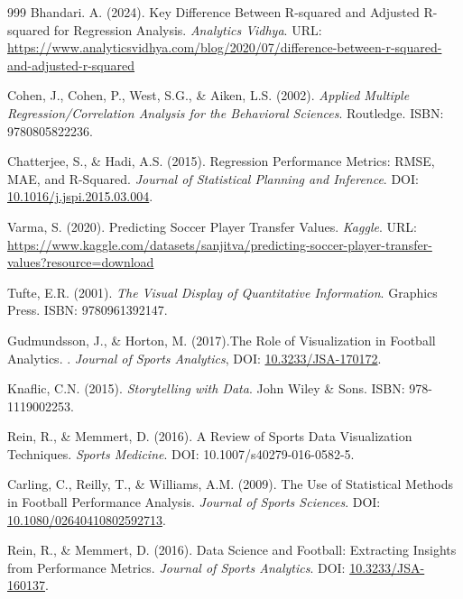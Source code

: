 \documentclass[12pt, a4paper,oneside]{book}
\numberwithin{equation}{section}
\begin{document}
\begin{thebibliography}{999}
Bhandari. A. (2024). Key Difference Between R-squared and Adjusted R-squared for Regression Analysis. \textit{Analytics Vidhya}. URL: \href{https://www.analyticsvidhya.com/blog/2020/07/difference-between-r-squared-and-adjusted-r-squared}{https://www.analyticsvidhya.com/blog/2020/07/difference-between-r-squared-and-adjusted-r-squared}

Cohen, J., Cohen, P., West, S.G., \& Aiken, L.S. (2002). \textit{Applied Multiple Regression/Correlation Analysis for the Behavioral Sciences}. Routledge. ISBN: 9780805822236.

Chatterjee, S., \& Hadi, A.S. (2015). Regression Performance Metrics: RMSE, MAE, and R-Squared. \textit{Journal of Statistical Planning and Inference}. DOI: \href{https://doi.org/10.1016/j.jspi.2015.03.004}{10.1016/j.jspi.2015.03.004}.

Varma, S. (2020). Predicting Soccer Player Transfer Values. \textit{Kaggle}. URL: \href{https://www.kaggle.com/datasets/sanjitva/predicting-soccer-player-transfer-values?resource=download}{https://www.kaggle.com/datasets/sanjitva/predicting-soccer-player-transfer-values?resource=download}

Tufte, E.R. (2001). \textit{The Visual Display of Quantitative Information}. Graphics Press. ISBN: 9780961392147.

Gudmundsson, J., \& Horton, M. (2017).The Role of Visualization in Football Analytics. . \textit{Journal of Sports Analytics}, DOI: \href{https://doi.org/10.3233/JSA-170172}{10.3233/JSA-170172}.

Knaflic, C.N. (2015). \textit{Storytelling with Data}. John Wiley \& Sons. ISBN: 978-1119002253.

Rein, R., \& Memmert, D. (2016). A Review of Sports Data Visualization Techniques. \textit{Sports Medicine}. DOI: 10.1007/s40279-016-0582-5.

Carling, C., Reilly, T., \& Williams, A.M. (2009). The Use of Statistical Methods in Football Performance Analysis. \textit{Journal of Sports Sciences}. DOI: \href{https://doi.org/10.1080/02640410802592713}{10.1080/02640410802592713}.

Rein, R., \& Memmert, D. (2016). Data Science and Football: Extracting Insights from Performance Metrics. \textit{Journal of Sports Analytics}. DOI: \href{https://doi.org/10.3233/JSA-160137}{10.3233/JSA-160137}.


\end{thebibliography}
\end{document}
